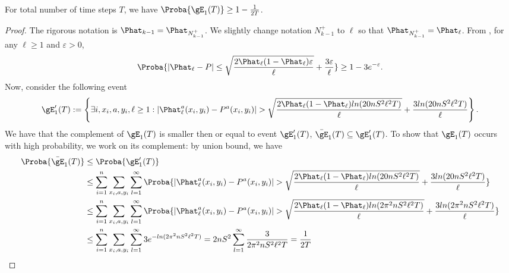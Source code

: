 \begin{lem}
    \label{lem:high_event1}
    For total number of time steps $T$, we have $\Proba{\gE_1(T)}\ge 1-\frac1{2T}$.
\end{lem}
\begin{proof}
The rigorous notation is $\Phat_{k-1}=\Phat_{N^+_{k-1}}$.
We slightly change notation $N^+_{k-1}$ to $\ell$ so that $\Phat_{N^+_{k-1}}=\Phat_\ell$.
From \cite[Theorem~1]{audibert2009exploration}, for any $\ell\ge1$ and $\varepsilon>0$,
\begin{align}
    \Proba{|\Phat_\ell-P|\le\sqrt{\frac{2\Phat_\ell(1-\Phat_\ell)\varepsilon}{\ell}} +\frac{3\varepsilon}{\ell}} \ge 1-3e^{-\varepsilon}. \label{eq:bern_concentration}
\end{align}
Now, consider the following event
\begin{align*}
    \gE'_1(T):=\left\{\exists i,x_i,a,y_i,\ell\ge1: |\Phat_\ell^a(x_i,y_i) -P^a(x_i,y_i)| > \sqrt{\frac{2\Phat_\ell(1-\Phat_\ell)ln(20nS^2\ell^2T)}\ell} +\frac{3ln(20nS^2\ell^2T)}{\ell}\right\}.
\end{align*}
We have that the complement of $\gE_1(T)$ is smaller then or equal to event $\gE'_1(T)$, $\bar{\gE}_1(T)\subseteq\gE'_1(T)$. To show that $\gE_1(T)$ occurs with high probability, we work on its complement: by union bound, we have
\begin{align*}
    \Proba{\bar{\gE}_1(T)}
    &\le \Proba{\gE'_1(T)} \\
    &\le \sum_{i=1}^{n} \sum_{x_i,a,y_i} \sum_{l=1}^{\infty} \Proba{|\Phat_\ell^a(x_i,y_i) -P^a(x_i,y_i)| > \sqrt{\frac{2\Phat_\ell(1-\Phat_\ell)ln(20nS^2\ell^2T)}\ell} +\frac{3ln(20nS^2\ell^2T)}{\ell}} \\
    &\le \sum_{i=1}^{n} \sum_{x_i,a,y_i} \sum_{l=1}^{\infty} \Proba{|\Phat_\ell^a(x_i,y_i) -P^a(x_i,y_i)| > \sqrt{\frac{2\Phat_\ell(1-\Phat_\ell)ln(2\pi^2nS^2\ell^2T)}\ell} +\frac{3ln(2\pi^2nS^2\ell^2T)}{\ell}} \\
    &\le \sum_{i=1}^{n} \sum_{x_i,a,y_i} \sum_{l=1}^{\infty} 3e^{-ln(2\pi^2nS^2\ell^2T)}
    =2nS^2\sum_{l=1}^{\infty}\frac{3}{2\pi^2nS^2\ell^2T} = \frac1{2T}
\end{align*}
\end{proof}

